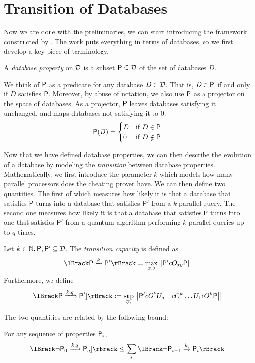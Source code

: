 \section{Transition of Databases}

Now we are done with the preliminaries, we can start introducing the framework constructed by \cite{main-result}.
The work puts everything in terms of databases, so we first develop a key piece of terminology.

\begin{defn}
	A \emph{database property} on $\mathcal{D}$ is a subset $\mathsf{P}\subseteq\mathcal{D}$ of the set of databases $D$.
\end{defn}

We think of $\mathsf{P}$ as a predicate for any database $D\in\mathcal{D}$.
That is, $D\in\mathsf{P}$ if and only if $D$ satisfies $\mathsf{P}$.
Moreover, by abuse of notation, we also use $\mathsf{P}$ as a projector on the space of databases.
As a projector, $\mathsf{P}$ leaves databases satisfying it unchanged, and maps databases not satisfying it to $0$.
$$
\mathsf{P}(D) = \begin{cases}
	D & \mbox{if } D\in\mathsf{P} \\
	0 & \mbox{if } D\notin\mathsf{P}
\end{cases}
$$

Now that we have defined database properties, we can then describe the evolution of a database by modeling the \emph{transition} between database properties.
Mathematically, we first introduce the parameter $k$ which models how many parallel processors does the cheating prover have.
We can then define two quantities.
The first of which measures how likely it is that a database that satisfies $\mathsf{P}$
turns into a database that satisfies $\mathsf{P}'$ from a $k$-parallel query.
The second one measures how likely it is that a database that satisfies $\mathsf{P}$
turns into one that satisfies $\mathsf{P}'$ from a quantum algorithm performing $k$-parallel queries up to $q$ times.

\begin{defn}
	Let $k\in\mathbb{N}, \mathsf{P}, \mathsf{P}'\subseteq\mathcal{D}$. The \emph{transition capacity} is defined as
	$$\lBrack \sfP \xrightarrow{k} \sfP'\rBrack = \max_{x, y} \norm{\sfP' cO_{xy} \sfP}$$
	Furthermore, we define
	$$\lBrack\sfP\xRightarrow{k,q}\sfP']\rBrack:=\sup_{U_i}\norm{\sfP' cO^k U_{q-1} cO^k\ldots U_1 cO^k \sfP}$$
\end{defn}

The two quantities are related by the following bound:
\begin{lem}
	\label{transition-multi-to-single}
	For any sequence of properties $\mathsf{P}_i$,
	$$\lBrack\neg \sfP_0\xrightarrow{k, q}\sfP_q]\rBrack
	\leq\sum_{i}\lBrack\neg \sfP_{i-1}\xrightarrow{k}\sfP_i\rBrack$$
\end{lem}

